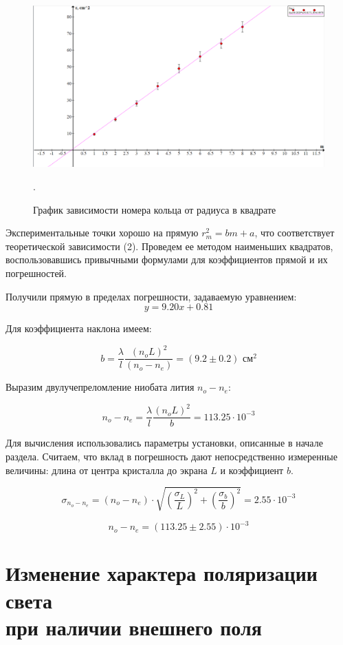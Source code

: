   	\begin{figure}[h!]
  		\label{C_g}
  		\includegraphics[scale=0.35]{pics/graph.png}
  		\caption{График зависимости номера кольца от радиуса в квадрате}. 
  	\end{figure}
  	
	
	
	Экспериментальные точки хорошо на прямую $r_m^2 = bm + a$, что соответствует теоретической зависимости (2). Проведем ее методом наименьших квадратов, воспользовавшись привычными формулами для коэффициентов прямой и их погрешностей.
	
	Получили прямую в пределах погрешности, задаваемую уравнением:
	\[  y = 9.20x + 0.81     \]
	
	Для коэффициента наклона имеем: 
	
	\[ b = \frac{\lambda}{l} \frac{(n_oL)^2}{(n_o - n_e)} = (9.2 \pm 0.2) \text{ см}^2 \] 
	
	Выразим двулучепреломление ниобата лития $n_o - n_e$:
	
	\[ n_o - n_e = \frac{\lambda}{l}\frac{(n_oL)^2}{b} = 113.25 \cdot 10^{-3} \]
	
	Для вычисления использовались параметры установки, описанные в начале раздела. Считаем, что вклад в погрешность дают непосредственно измеренные величины: длина от центра кристалла до экрана $L$ и коэффициент $b$.
	
	\[ \sigma_{n_o - n_e} = (n_o - n_e)\cdot \sqrt{ \left(\frac{\sigma_L}{L}\right)^{2} + \left(\frac{\sigma_b}{b}\right)^{2} }  = 2.55 \cdot 10^{-3}    \]
	
	\[ n_o - n_e = (113.25 \pm 2.55)\cdot 10^{-3}   \]
	
	\section{Изменение характера поляризации света \\ при наличии внешнего поля}
